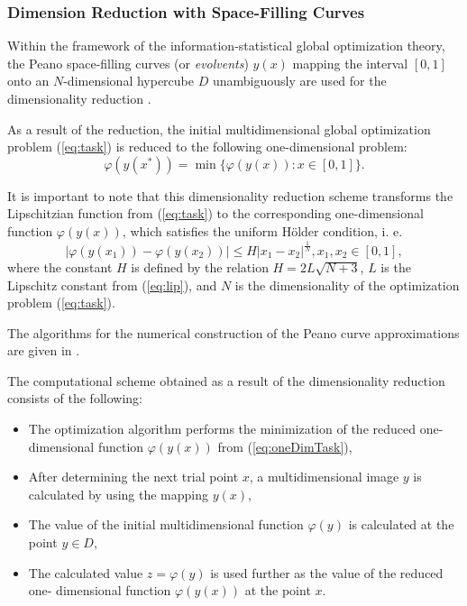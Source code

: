 \documentclass[runningheads]{llncs}
\begin{document}
\subsubsection{Dimension Reduction with Space-Filling Curves}
Within the framework of the information-statistical global optimization theory,
the Peano space-filling curves (or \textit{evolvents}) \(y(x)\) mapping the interval \([0,1]\)
onto an \(N\)-dimensional hypercube \(D\) unambiguously are used for the dimensionality
reduction \cite{sergeyevStronginLera2013, strongin1978, strSergGO}.
\par
As a result of the reduction, the initial multidimensional global optimization
problem (\ref{eq:task}) is reduced to the following one-dimensional problem:
\begin{equation}
\label{eq:oneDimTask}
\varphi(y(x^*))=\min\{\varphi(y(x)):x\in [0,1]\}.
\end{equation}
\par
It is important to note that this dimensionality reduction scheme transforms the %
Lipschitzian function from (\ref{eq:task}) to the corresponding one-dimensional
function \(\varphi(y(x))\), which satisfies the uniform H{\"o}lder condition, i. e.
\begin{equation}
\label{eq:holder}
|\varphi(y(x_1))-\varphi(y(x_2))|\leq H{|x_1-x_2|}^{\frac{1}{N}}, x_1,x_2\in[0,1],
\end{equation}
where the constant $H$ is defined by the relation \(H=2L\sqrt{N+3}\), \(L\) is the Lipschitz
constant from (\ref{eq:lip}), and \(N\) is the dimensionality of the optimization problem
(\ref{eq:task}).
\par
The algorithms for the numerical construction of the Peano curve approximations are
given in \cite{strSergGO}.

\par
The computational scheme obtained as a result of the dimensionality reduction consists of the
following:
\begin{itemize}
  \item The optimization algorithm performs the minimization of the reduced one-dimensional
  function \(\varphi(y(x))\) from (\ref{eq:oneDimTask}),
  \item After determining the next trial point \(x\), a multidimensional image \(y\) is calculated by
using the mapping \(y(x)\),
  \item The value of the initial multidimensional function \(\varphi(y)\) is calculated at the point
\(y\in D\),
  \item The calculated value \(z=\varphi(y)\) is used further as the value of the reduced one-
dimensional function \(\varphi(y(x))\) at the point \(x\).
\end{itemize}
\end{document}
